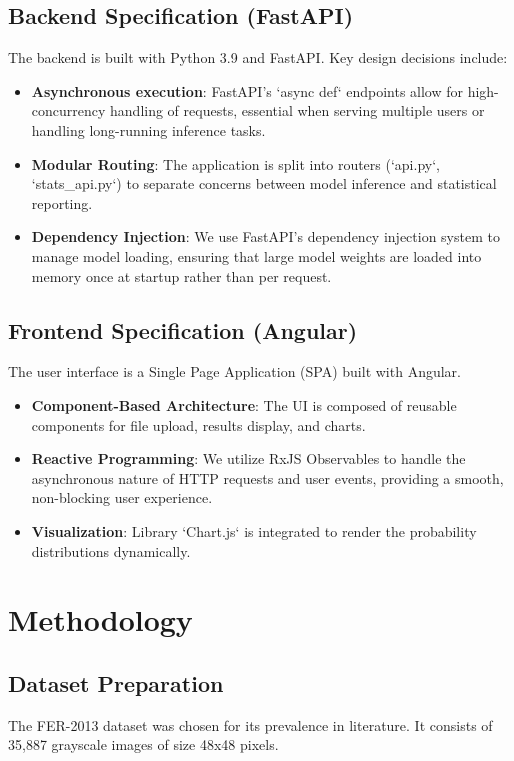 \documentclass[a4paper,12pt]{article}
\begin{document}
\subsection{Backend Specification (FastAPI)}
The backend is built with Python 3.9 and FastAPI. Key design decisions include:
\begin{itemize}
    \item \textbf{Asynchronous execution}: FastAPI's `async def` endpoints allow for high-concurrency handling of requests, essential when serving multiple users or handling long-running inference tasks.
    \item \textbf{Modular Routing}: The application is split into routers (`api.py`, `stats_api.py`) to separate concerns between model inference and statistical reporting.
    \item \textbf{Dependency Injection}: We use FastAPI's dependency injection system to manage model loading, ensuring that large model weights are loaded into memory once at startup rather than per request.
\end{itemize}

\subsection{Frontend Specification (Angular)}
The user interface is a Single Page Application (SPA) built with Angular.
\begin{itemize}
    \item \textbf{Component-Based Architecture}: The UI is composed of reusable components for file upload, results display, and charts.
    \item \textbf{Reactive Programming}: We utilize RxJS Observables to handle the asynchronous nature of HTTP requests and user events, providing a smooth, non-blocking user experience.
    \item \textbf{Visualization}: Library `Chart.js` is integrated to render the probability distributions dynamically.
\end{itemize}

\section{Methodology}

\subsection{Dataset Preparation}
The FER-2013 dataset was chosen for its prevalence in literature. It consists of 35,887 grayscale images of size 48x48 pixels.
\end{document}
